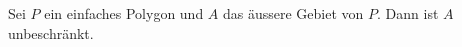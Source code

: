 \begin{lemma}
    Sei $P$ ein einfaches Polygon und $A$ das äussere Gebiet von $P$. 
    Dann ist $A$ unbeschränkt.
\end{lemma}